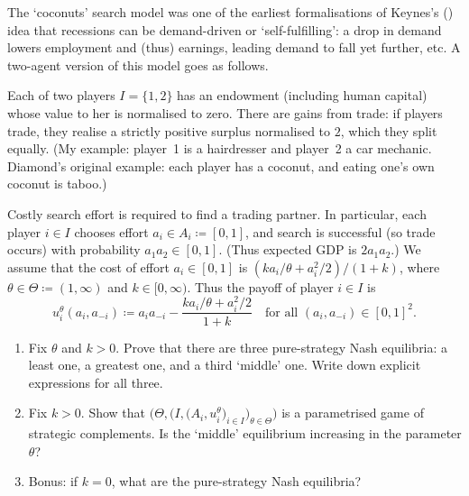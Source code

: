 \begin{exercise}
	\label{exercise:diamond_mcs}
	The \textcite{Diamond1982} `coconuts' search model was one of the earliest formalisations of Keynes's (\citeyear{Keynes1936}) idea that recessions can be demand-driven or `self-fulfilling': a drop in demand lowers employment and (thus) earnings, leading demand to fall yet further, etc. A two-agent version of this model \parencite[based on][section~4]{MilgromRoberts1990} goes as follows.

	Each of two players $I = \{1,2\}$ has an endowment (including human capital) whose value to her is normalised to zero. There are gains from trade: if players trade, they realise a strictly positive surplus normalised to $2$, which they split equally. (My example: player~1 is a hairdresser and player~2 a car mechanic. Diamond's original example: each player has a coconut, and eating one's own coconut is taboo.)

	Costly search effort is required to find a trading partner. In particular, each player $i \in I$ chooses effort $a_i \in A_i \coloneqq [0,1]$, and search is successful (so trade occurs) with probability $a_1 a_2 \in [0,1]$. (Thus expected GDP is $2 a_1 a_2$.) We assume that the cost of effort $a_i \in [0,1]$ is $\left( k a_i / \theta + a_i^2/2 \right) / (1+k)$, where $\theta \in \Theta \coloneqq (1,\infty)$ and $k \in [0,\infty)$. Thus the payoff of player $i \in I$ is
	\begin{equation*}
		u_i^\theta(a_i,a_{-i})
		\coloneqq a_i a_{-i}
		- \frac{ k a_i / \theta + a_i^2/2 }{1+k}
		\quad \text{for all $(a_i,a_{-i}) \in [0,1]^2$.}
	\end{equation*}

	\begin{enumerate}[label=(\alph*)]
	
		\item Fix $\theta$ and $k > 0$. Prove that there are three pure-strategy Nash equilibria: a least one, a greatest one, and a third `middle' one. Write down explicit expressions for all three.

		\item Fix $k > 0$. Show that $\bigl( \Theta, \bigl( I,\bigl(A_i,u_i^\theta\bigr)_{i \in I} \bigr)_{\theta \in \Theta} \bigr)$ is a parametrised game of strategic complements. Is the `middle' equilibrium increasing in the parameter $\theta$?

		\item Bonus: if $k=0$, what are the pure-strategy Nash equilibria?
	
	\end{enumerate}
\end{exercise}



